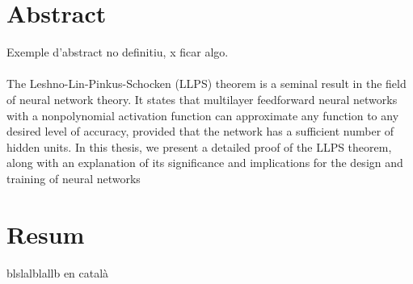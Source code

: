 \documentclass[../../main.tex]{subfiles}
\begin{document}
\chapter*{Abstract}\label{ch:abstract} 
Exemple d'abstract no definitiu, x ficar algo.  \\ \\ 
The Leshno-Lin-Pinkus-Schocken (LLPS) theorem is a seminal result in the field of neural network theory. It states that multilayer feedforward neural networks with a nonpolynomial activation function can approximate any function to any desired level of accuracy, provided that the network has a sufficient number of hidden units. In this thesis, we present a detailed proof of the LLPS theorem, along with an explanation of its significance and implications for the design and training of neural networks


\chapter*{Resum}

blslalblallb en català
\end{document}
